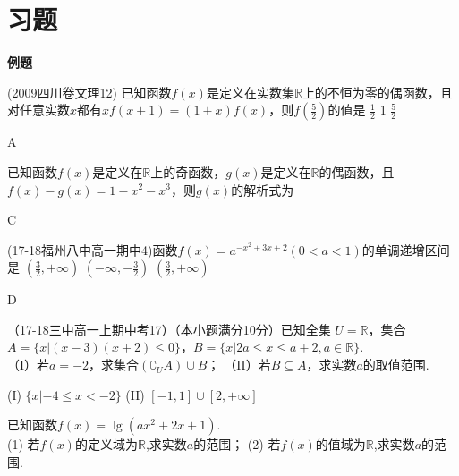 \section{习题}
\startexercise
\begin{exercise}{\large \bf 例\hspace{0.6em}题}

\item
(2009四川卷文理12) 已知函数$f(x)$是定义在实数集$\mathbb{R}$上的不恒为零的偶函数，且对任意实数$x$都有$xf(x+1)=(1+x)f(x) $，则$f(\frac{5}{2}) $的值是\xz
{}
{$\frac12$}
{1}
{$\frac52$}
\begin{answer}
A
\end{answer}


\item
已知函数$f(x)$是定义在$\mathbb{R}$上的奇函数，$g(x)$是定义在$\mathbb{R} $的偶函数，且$f(x)-g(x)=1-x^2-x^3 $，则$g(x) $的解析式为\xz
{}
\begin{answer}
C
\end{answer}


\item 
(17-18福州八中高一期中4)函数$f(x)=a^{-x^2+3x+2}(0<a<1)$的单调递增区间是\xz
        {$(\frac32,+\infty)$}
        {$(-\infty,-\frac32)$} 
        {$(\frac32,+\infty)$}
\begin{answer}
D
\end{answer}

\item
（17-18三中高一上期中考17）（本小题满分10分）已知全集 $U=\mathbb{R}$，集合$A=\{x|(x-3)(x+2)\leq0\} $，$B=\{x|2a\leq x\leq a+2,a\in \mathbb{R} \} $.\\
（I）若$a=-2 $，求集合$(\complement_UA)\cup B $；
（II）若$B\subseteq A $，求实数$a $的取值范围.
\begin{answer}
 (I) $\{x|-4\leq x<-2 \} $
 (II) $[-1,1]\cup[2,+\infty] $
\end{answer}
\vspace{12em}

\item
已知函数$f(x)=\lg(ax^2+2x+1) $.\\
(1) 若$f(x)$的定义域为$\mathbb{R}$,求实数$a$的范围；
(2) 若$f(x)$的值域为$\mathbb{R}$,求实数$a$的范围.
\vspace{12em}


\end{exercise}
